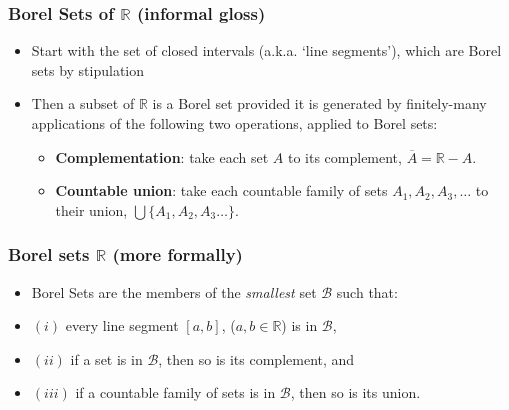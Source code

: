 

\begin{frame}
\frametitle{Borel Sets of $\mathbb{R}$ (informal gloss)}


\begin{itemize}[<+->]

\item Start with the set of closed intervals (a.k.a. `line segments'), which are Borel sets by stipulation

\item Then a subset of $\mathbb{R}$ is a Borel set provided it is generated by finitely-many applications of the following two operations, applied to Borel sets:

\begin{itemize}
\item \textbf{Complementation}: take each set $A$ to its complement, $\overline{A}= \mathbb{R}-A$.

\item \textbf{Countable union}: take each countable family of sets $A_1, A_2, A_3, \ldots$ to their union, $\bigcup \{A_1, A_2 , A_3 \dots\}$.\label{gloss:count-un} 

\end{itemize}

\bigskip

\end{itemize}
\end{frame}

\begin{frame}
\frametitle{Borel sets $\mathbb{R}$ (more formally)}

\begin{itemize}[<+->]

\item Borel Sets are the members of the \textit{smallest} set $\mathscr{B}$ such that: 
\bi
\item[] $(i)$ every line segment $[a,b]$, ($a, b \in \mathbb{R}$) is in $\mathscr{B}$, 
\item[] $(ii)$ if a set is in $\mathscr{B}$, then so is its complement, and 
\item[] $(iii)$ if a countable family of sets is in $\mathscr{B}$, then so is its union.
\ei

\end{itemize}
\end{frame}

